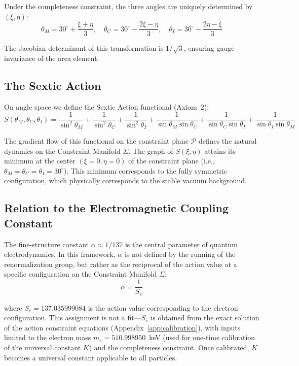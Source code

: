 \documentclass[aps,prd,reprint,nofootinbib]{revtex4-2}
\begin{document}
Under the completeness constraint, the three angles are uniquely determined by $(\xi, \eta)$:
\begin{equation}
\theta_M = 30^\circ + \frac{\xi+\eta}{3}, \quad \theta_C = 30^\circ - \frac{2\xi-\eta}{3}, \quad \theta_I = 30^\circ - \frac{2\eta-\xi}{3} \label{eq:inverse}
\end{equation}

The Jacobian determinant of this transformation is $1/\sqrt{3}$, ensuring gauge invariance of the area element.

\subsection{The Sextic Action}

On angle space we define the Sextic Action functional (Axiom~2):
\begin{equation}
S(\theta_M, \theta_C, \theta_I) = \frac{1}{\sin^2\theta_M} + \frac{1}{\sin^2\theta_C} + \frac{1}{\sin^2\theta_I}
+ \frac{1}{\sin\theta_M\sin\theta_C} + \frac{1}{\sin\theta_C\sin\theta_I} + \frac{1}{\sin\theta_I\sin\theta_M} \label{eq:S}
\end{equation}

The gradient flow of this functional on the constraint plane $\mathcal{P}$ defines the natural dynamics on the Constraint Manifold $\Sigma$. The graph of $S(\xi, \eta)$ attains its minimum at the center $(\xi = 0, \eta = 0)$ of the constraint plane (i.e., $\theta_M = \theta_C = \theta_I = 30^\circ$). This minimum corresponds to the fully symmetric configuration, which physically corresponds to the stable vacuum background.

\subsection{Relation to the Electromagnetic Coupling Constant}

The fine-structure constant $\alpha \approx 1/137$ is the central parameter of quantum electrodynamics. In this framework, $\alpha$ is not defined by the running of the renormalization group, but rather as the reciprocal of the action value at a specific configuration on the Constraint Manifold $\Sigma$:
\begin{equation}
\alpha = \frac{1}{S_e} \label{eq:alpha}
\end{equation}

where $S_e = 137.035999084$ is the action value corresponding to the electron configuration. This assignment is not a fit---$S_e$ is obtained from the exact solution of the action constraint equations (Appendix~\ref{app:calibration}), with inputs limited to the electron mass $m_e = 510.998950$~keV (used for one-time calibration of the universal constant $K$) and the completeness constraint. Once calibrated, $K$ becomes a universal constant applicable to all particles.
\end{document}
